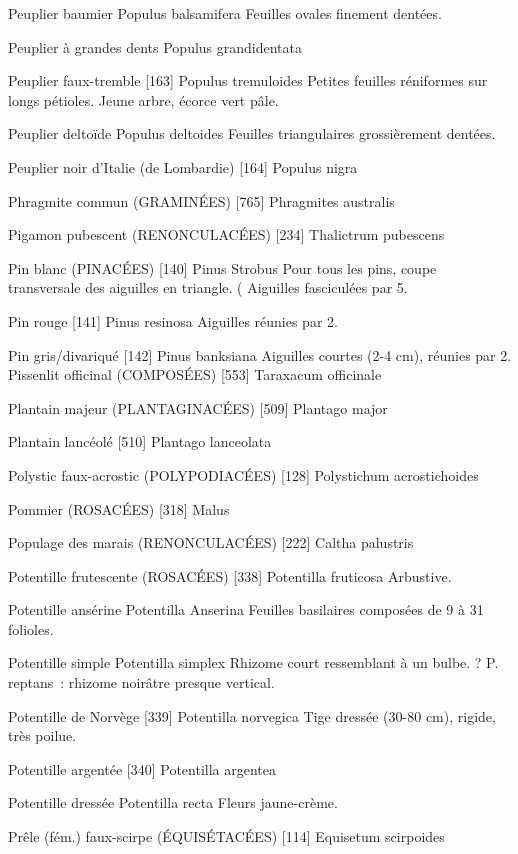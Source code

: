 \documentclass[book,12pt,a4paper,onecolumn,openany]{memoir}
\begin{document}
Peuplier baumier
				Populus balsamifera
Feuilles ovales finement dentées.

Peuplier à grandes dents
				Populus grandidentata

Peuplier faux-tremble  [163]
				Populus tremuloides
Petites feuilles réniformes sur longs pétioles.
Jeune arbre, écorce vert pâle.

Peuplier deltoïde
				Populus deltoides
Feuilles triangulaires grossièrement dentées.

Peuplier noir d’Italie (de Lombardie)  [164]
				Populus nigra

Phragmite commun (GRAMINÉES)  [765]
				Phragmites australis

Pigamon pubescent (RENONCULACÉES)  [234]
				Thalictrum pubescens

Pin blanc (PINACÉES)  [140]
				Pinus Strobus
Pour tous les pins, coupe transversale des aiguilles en triangle. (
Aiguilles fasciculées par 5.

Pin rouge  [141]
				Pinus resinosa
Aiguilles réunies par 2.

Pin gris/divariqué  [142]
				Pinus banksiana
Aiguilles courtes (2-4 cm), réunies par 2.
Pissenlit officinal (COMPOSÉES)  [553]
				Taraxacum officinale

Plantain majeur (PLANTAGINACÉES)  [509]
				Plantago major

Plantain lancéolé  [510]
				Plantago lanceolata

Polystic faux-acrostic (POLYPODIACÉES)  [128]
				Polystichum acrostichoides

Pommier (ROSACÉES)  [318]
				Malus

Populage des marais (RENONCULACÉES)  [222]
				Caltha palustris

Potentille frutescente (ROSACÉES)  [338]
				Potentilla fruticosa
Arbustive.



Potentille ansérine
				Potentilla Anserina
Feuilles basilaires composées de 9 à 31 folioles.

Potentille simple
				Potentilla simplex
Rhizome court ressemblant à un bulbe.
? P. reptans : rhizome noirâtre presque vertical.

Potentille de Norvège  [339]
				Potentilla norvegica
Tige dressée (30-80 cm), rigide, très poilue.

Potentille argentée  [340]
				Potentilla argentea

Potentille dressée
				Potentilla recta
Fleurs jaune-crème.

Prêle (fém.) faux-scirpe (ÉQUISÉTACÉES) [114]
				Equisetum scirpoides
\end{document}
